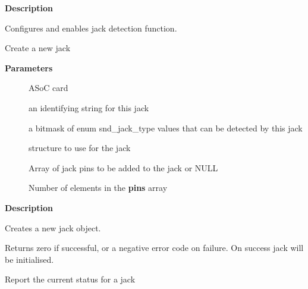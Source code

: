 \documentclass[a4paper,8pt,english]{sphinxmanual}
\begin{document}
\textbf{Description}

Configures and enables jack detection function.

\begin{fulllineitems}
\label{sound/kernel-api/alsa-driver-api:c.snd_soc_card_jack_new}
Create a new jack

\end{fulllineitems}


\textbf{Parameters}
\begin{description}
\item[{}] \leavevmode
ASoC card

\item[{}] \leavevmode
an identifying string for this jack

\item[{}] \leavevmode
a bitmask of enum snd\_jack\_type values that can be detected by
this jack

\item[{}] \leavevmode
structure to use for the jack

\item[{}] \leavevmode
Array of jack pins to be added to the jack or NULL

\item[{}] \leavevmode
Number of elements in the \textbf{pins} array

\end{description}

\textbf{Description}

Creates a new jack object.

Returns zero if successful, or a negative error code on failure.
On success jack will be initialised.

\begin{fulllineitems}
\label{sound/kernel-api/alsa-driver-api:c.snd_soc_jack_report}
Report the current status for a jack

\end{fulllineitems}
\end{document}
